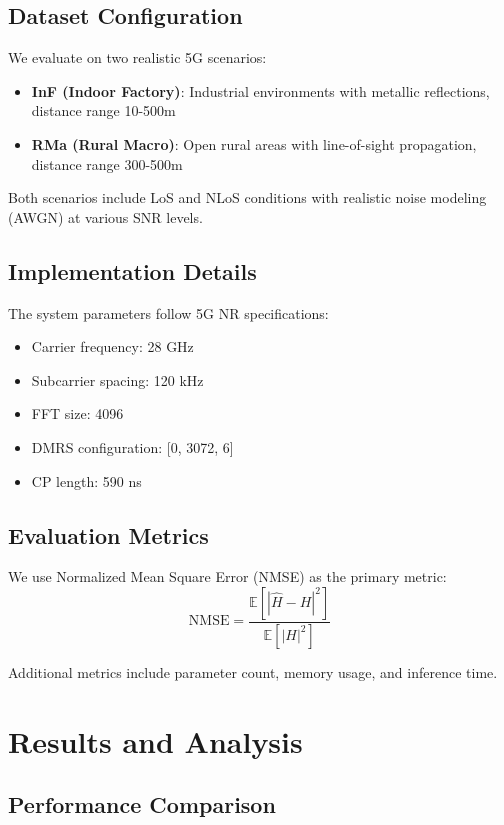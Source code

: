 \documentclass[conference]{IEEEtran}
\begin{document}
\subsection{Dataset Configuration}

We evaluate on two realistic 5G scenarios:
\begin{itemize}
\item \textbf{InF (Indoor Factory)}: Industrial environments with metallic reflections, distance range 10-500m
\item \textbf{RMa (Rural Macro)}: Open rural areas with line-of-sight propagation, distance range 300-500m
\end{itemize}

Both scenarios include LoS and NLoS conditions with realistic noise modeling (AWGN) at various SNR levels.

\subsection{Implementation Details}

The system parameters follow 5G NR specifications:
\begin{itemize}
\item Carrier frequency: 28 GHz
\item Subcarrier spacing: 120 kHz
\item FFT size: 4096
\item DMRS configuration: [0, 3072, 6]
\item CP length: 590 ns
\end{itemize}

\subsection{Evaluation Metrics}

We use Normalized Mean Square Error (NMSE) as the primary metric:
\begin{equation}
\text{NMSE} = \frac{\mathbb{E}[|\hat{H} - H|^2]}{\mathbb{E}[|H|^2]}
\end{equation}

Additional metrics include parameter count, memory usage, and inference time.

\section{Results and Analysis}

\subsection{Performance Comparison}
\end{document}
